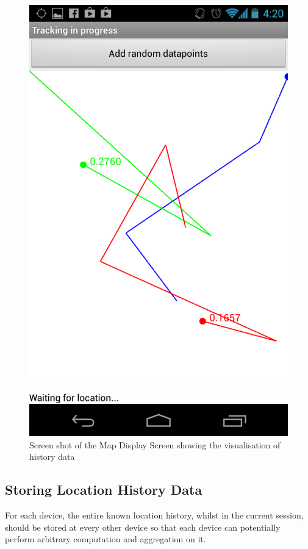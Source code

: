 \begin{figure}
\centering
\includegraphics[scale=0.15]{mapScreen}
\caption{Screen shot of the Map Display Screen showing the visualisation of history data}
\label{fig:mapScreen}
\end{figure}

\subsection{Storing Location History Data}

For each device, the entire known location history, whilst in the current session, should be stored at every other device so that each device can potentially perform arbitrary computation and aggregation on it.

